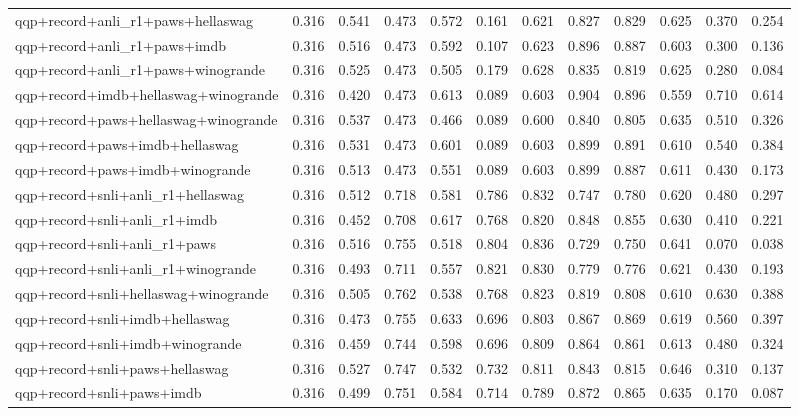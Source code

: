 \begin{table}[t]
\begin{tabular}{lrrrrrrrrrrr}
    qqp+record+anli\_r1+paws+hellaswag & 0.316 & 0.541 & 0.473 & 0.572 & 0.161 & 0.621 & 0.827 & 0.829 & 0.625 & 0.370 & 0.254 \\
    qqp+record+anli\_r1+paws+imdb & 0.316 & 0.516 & 0.473 & 0.592 & 0.107 & 0.623 & 0.896 & 0.887 & 0.603 & 0.300 & 0.136 \\
    qqp+record+anli\_r1+paws+winogrande & 0.316 & 0.525 & 0.473 & 0.505 & 0.179 & 0.628 & 0.835 & 0.819 & 0.625 & 0.280 & 0.084 \\
    qqp+record+imdb+hellaswag+winogrande & 0.316 & 0.420 & 0.473 & 0.613 & 0.089 & 0.603 & 0.904 & 0.896 & 0.559 & 0.710 & 0.614 \\
    qqp+record+paws+hellaswag+winogrande & 0.316 & 0.537 & 0.473 & 0.466 & 0.089 & 0.600 & 0.840 & 0.805 & 0.635 & 0.510 & 0.326 \\
    qqp+record+paws+imdb+hellaswag & 0.316 & 0.531 & 0.473 & 0.601 & 0.089 & 0.603 & 0.899 & 0.891 & 0.610 & 0.540 & 0.384 \\
    qqp+record+paws+imdb+winogrande & 0.316 & 0.513 & 0.473 & 0.551 & 0.089 & 0.603 & 0.899 & 0.887 & 0.611 & 0.430 & 0.173 \\
    qqp+record+snli+anli\_r1+hellaswag & 0.316 & 0.512 & 0.718 & 0.581 & 0.786 & 0.832 & 0.747 & 0.780 & 0.620 & 0.480 & 0.297 \\
    qqp+record+snli+anli\_r1+imdb & 0.316 & 0.452 & 0.708 & 0.617 & 0.768 & 0.820 & 0.848 & 0.855 & 0.630 & 0.410 & 0.221 \\
    qqp+record+snli+anli\_r1+paws & 0.316 & 0.516 & 0.755 & 0.518 & 0.804 & 0.836 & 0.729 & 0.750 & 0.641 & 0.070 & 0.038 \\
    qqp+record+snli+anli\_r1+winogrande & 0.316 & 0.493 & 0.711 & 0.557 & 0.821 & 0.830 & 0.779 & 0.776 & 0.621 & 0.430 & 0.193 \\
    qqp+record+snli+hellaswag+winogrande & 0.316 & 0.505 & 0.762 & 0.538 & 0.768 & 0.823 & 0.819 & 0.808 & 0.610 & 0.630 & 0.388 \\
    qqp+record+snli+imdb+hellaswag & 0.316 & 0.473 & 0.755 & 0.633 & 0.696 & 0.803 & 0.867 & 0.869 & 0.619 & 0.560 & 0.397 \\
    qqp+record+snli+imdb+winogrande & 0.316 & 0.459 & 0.744 & 0.598 & 0.696 & 0.809 & 0.864 & 0.861 & 0.613 & 0.480 & 0.324 \\
    qqp+record+snli+paws+hellaswag & 0.316 & 0.527 & 0.747 & 0.532 & 0.732 & 0.811 & 0.843 & 0.815 & 0.646 & 0.310 & 0.137 \\
    qqp+record+snli+paws+imdb & 0.316 & 0.499 & 0.751 & 0.584 & 0.714 & 0.789 & 0.872 & 0.865 & 0.635 & 0.170 & 0.087 \\

\end{tabular}
\end{table}
